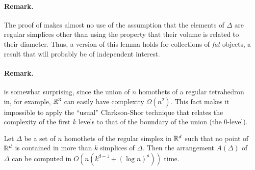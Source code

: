 \documentclass[lotsofwhite]{patmorin}
\begin{document}
\paragraph{Remark.} The proof of  makes almost no use
of the assumption that the elements of $\Delta$ are regular simplices other
than using the property that their volume is related to their diameter.
Thus, a version of this lemma holds for collections of \emph{fat} objects,
a result that will probably be of independent interest.

\paragraph{Remark.}  is somewhat surprising, since the
union of $n$ homothets of a regular tetrahedron in, for example, $\mathbb{R}^3$ can
easily have complexity $\Omega(n^2)$.  This fact makes it impossible to
apply the ``usual'' Clarkson-Shor technique \cite{cs89} that relates the
complexity of the first $k$ levels to that of the boundary of the union
(the 0-level).

\begin{lem}
  Let $\Delta$ be a set of $n$ homothets of the regular simplex in
  $\mathbb{R}^d$ such that no point of $\mathbb{R}^d$ is contained in more than $k$
  simplices of $\Delta$.  Then the arrangement $A(\Delta)$ of $\Delta$
  can be computed in $O(n(k^{d-1}+(\log n)^{d}))$ time.
\end{lem}
\end{document}
